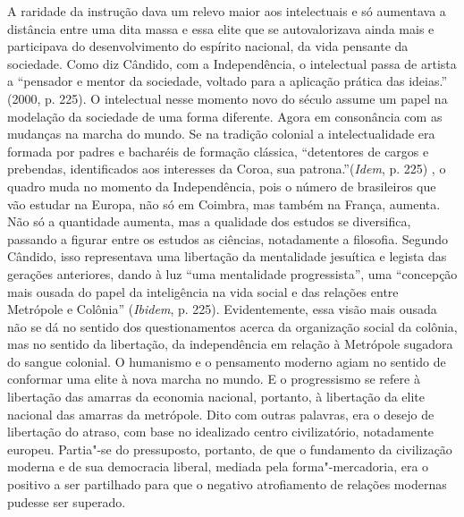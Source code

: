 A raridade da instrução dava um relevo maior aos intelectuais e só
aumentava a distância entre uma dita massa e essa elite que se
autovalorizava ainda mais e participava do desenvolvimento do espírito
nacional, da vida pensante da sociedade. Como diz Cândido, com a
Independência, o intelectual passa de artista a ``pensador e mentor da
sociedade, voltado para a aplicação prática das ideias.'' (2000, p.
225). O intelectual nesse momento novo do século  assume um
papel na modelação da sociedade de uma forma diferente. Agora em
consonância com as mudanças na marcha do mundo. Se na tradição colonial
a intelectualidade era formada por padres e bacharéis de formação
clássica, ``detentores de cargos e prebendas, identificados aos
interesses da Coroa, sua patrona.''(\emph{Idem}, p. 225) , o quadro muda
no momento da Independência, pois o número de brasileiros que vão
estudar na Europa, não só em Coimbra, mas também na França, aumenta. Não
só a quantidade aumenta, mas a qualidade dos estudos se diversifica,
passando a figurar entre os estudos as ciências, notadamente a
filosofia. Segundo Cândido, isso representava uma libertação da
mentalidade jesuítica e legista das gerações anteriores, dando à luz
``uma mentalidade progressista'', uma ``concepção mais ousada do papel
da inteligência na vida social e das relações entre Metrópole e
Colônia'' (\emph{Ibidem}, p. 225). Evidentemente, essa visão mais ousada
não se dá no sentido dos questionamentos acerca da organização social da
colônia, mas no sentido da libertação, da independência em relação à
Metrópole sugadora do sangue colonial. O humanismo e o pensamento
moderno agiam no sentido de conformar uma elite à nova marcha no mundo.
E o progressismo se refere à libertação das amarras da economia
nacional, portanto, à libertação da elite nacional das amarras da
metrópole. Dito com outras palavras, era o desejo de libertação do
atraso, com base no idealizado centro civilizatório, notadamente
europeu. Partia"-se do pressuposto, portanto, de que o fundamento da
civilização moderna e de sua democracia liberal, mediada pela
forma"-mercadoria, era o positivo a ser partilhado para que o negativo
atrofiamento de relações modernas pudesse ser superado.

